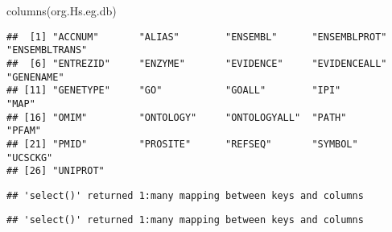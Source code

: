 \documentclass[
]{article}
\newenvironment{Shaded}{\begin{snugshade}}{\end{snugshade}}
\newcommand{\AttributeTok}[1]{\textcolor[rgb]{0.77,0.63,0.00}{#1}}
\newcommand{\FunctionTok}[1]{\textcolor[rgb]{0.00,0.00,0.00}{#1}}
\newcommand{\NormalTok}[1]{#1}
\newcommand{\OtherTok}[1]{\textcolor[rgb]{0.56,0.35,0.01}{#1}}
\newcommand{\SpecialCharTok}[1]{\textcolor[rgb]{0.00,0.00,0.00}{#1}}
\newcommand{\StringTok}[1]{\textcolor[rgb]{0.31,0.60,0.02}{#1}}
\begin{document}
\begin{Shaded}
\begin{Highlighting}[]
\FunctionTok{columns}\NormalTok{(org.Hs.eg.db)}
\end{Highlighting}
\end{Shaded}

\begin{verbatim}
##  [1] "ACCNUM"       "ALIAS"        "ENSEMBL"      "ENSEMBLPROT"  "ENSEMBLTRANS"
##  [6] "ENTREZID"     "ENZYME"       "EVIDENCE"     "EVIDENCEALL"  "GENENAME"    
## [11] "GENETYPE"     "GO"           "GOALL"        "IPI"          "MAP"         
## [16] "OMIM"         "ONTOLOGY"     "ONTOLOGYALL"  "PATH"         "PFAM"        
## [21] "PMID"         "PROSITE"      "REFSEQ"       "SYMBOL"       "UCSCKG"      
## [26] "UNIPROT"
\end{verbatim}

\begin{Shaded}
\end{Shaded}

\begin{verbatim}
## 'select()' returned 1:many mapping between keys and columns
\end{verbatim}

\begin{Shaded}
\end{Shaded}

\begin{verbatim}
## 'select()' returned 1:many mapping between keys and columns
\end{verbatim}

\begin{Shaded}
\end{Shaded}
\end{document}
